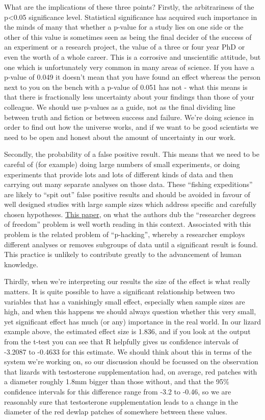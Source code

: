 \documentclass[
]{book}
\begin{document}
What are the implications of these three points? Firstly, the arbitrariness of the p\textless0.05 significance level. Statistical significance has acquired such importance in the minds of many that whether a p-value for a study lies on one side or the other of this value is sometimes seen as being the final decider of the success of an experiment or a research project, the value of a three or four year PhD or even the worth of a whole career. This is a corrosive and unscientific attitude, but one which is unfortunately very common in many areas of science. If you have a p-value of 0.049 it doesn't mean that you have found an effect whereas the person next to you on the bench with a p-value of 0.051 has not - what this means is that there is fractionally less uncertainty about your findings than those of your colleague. We should use p-values as a guide, not as the final dividing line between truth and fiction or between success and failure. We're doing science in order to find out how the universe works, and if we want to be good scientists we need to be open and honest about the amount of uncertainty in our work.

Secondly, the probability of a false positive result. This means that we need to be careful of (for example) doing large numbers of small experiments, or doing experiments that provide lots and lots of different kinds of data and then carrying out many separate analyses on those data. These ``fishing expeditions'' are likely to ``spit out'' false positive results and should be avoided in favour of well designed studies with large sample sizes which address specific and carefully chosen hypotheses. \href{http://pss.sagepub.com/content/22/11/1359.full}{This paper}, on what the authors dub the ``researcher degrees of freedom'' problem is well worth reading in this context. Associated with this problem is the related problem of ``p-hacking'', whereby a researcher employs different analyses or removes subgroups of data until a significant result is found. This practice is unlikely to contribute greatly to the advancement of human knowledge.

Thirdly, when we're interpreting our results the size of the effect is what really matters. It is quite possible to have a significant relationship between two variables that has a vanishingly small effect, especially when sample sizes are high, and when this happens we should always question whether this very small, yet significant effect has much (or any) importance in the real world. In our lizard example above, the estimated effect size is 1.836, and if you look at the output from the t-test you can see that R helpfully gives us confidence intervals of -3.2087 to -0.4633 for this estimate. We should think about this in terms of the system we're working on, so our discussion should be focussed on the observation that lizards with testosterone supplementation had, on average, red patches with a diameter roughly 1.8mm bigger than those without, and that the 95\% confidence intervals for this difference range from -3.2 to -0.46, so we are reasonably sure that testosterone supplementation leads to a change in the diameter of the red dewlap patches of somewhere between these values.
\end{document}
